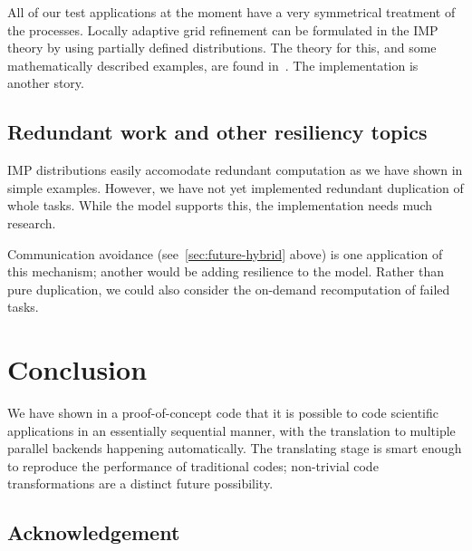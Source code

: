 \documentclass[11pt,fleqn,preprint]{impreport}
\begin{document}
All of our test applications at the moment have a very symmetrical
treatment of the processes. Locally adaptive grid refinement
can be formulated in the IMP theory by using partially defined
distributions. The theory for this, and some mathematically described
examples, are found in~. The implementation is another story.

\subsection{Redundant work and other resiliency topics}

IMP distributions easily accomodate redundant computation as we have
shown in simple examples. However, we have not yet implemented redundant
duplication of whole tasks. While the model supports this, the implementation
needs much research.

Communication avoidance (see~\ref{sec:future-hybrid} above) is one application
of this mechanism; another would be adding resilience to the model.
Rather than pure duplication, we could also consider the on-demand recomputation
of failed tasks.

\section{Conclusion}

We have shown in a proof-of-concept code that it is possible to code
scientific applications in an essentially sequential manner,
with the translation to multiple parallel backends happening
automatically. The translating stage is smart enough to reproduce
the performance of traditional codes; non-trivial code transformations
are a distinct future possibility.

\subsection*{Acknowledgement}




\end{document}
